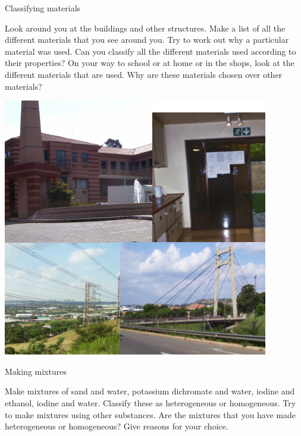   \label{m38708*eip-478}\begin{activity}{Classifying materials}
{\begin{minipage}{.5\textwidth}
Look around you at the buildings and other structures. Make a list of all the different materials that you see around you. Try to work out why a particular material was used. Can you classify all the different materials used according to their properties? On your way to school or at home or in the shops, look at the different materials that are used. Why are these materials chosen over other materials?\par \label{m38708*eip-894}
\end{minipage}
\begin{minipage}{.5\textwidth}
\begin{center}
 \includegraphics[width=.8\textwidth]{photos/materials.png}\par
\end{center}
\end{minipage}
}
\end{activity}
\begin{activity}{Making mixtures}
{Make mixtures of sand and water, potassium dichromate and water, iodine and ethanol, iodine and water. Classify these as heterogeneous or homogeneous. Try to make mixtures using other substances. Are the mixtures that you have made heterogeneous or homogeneous? Give reasons for your choice. \par}
\end{activity}
\label{m38708*secfhsst!!!underscore!!!id169}

